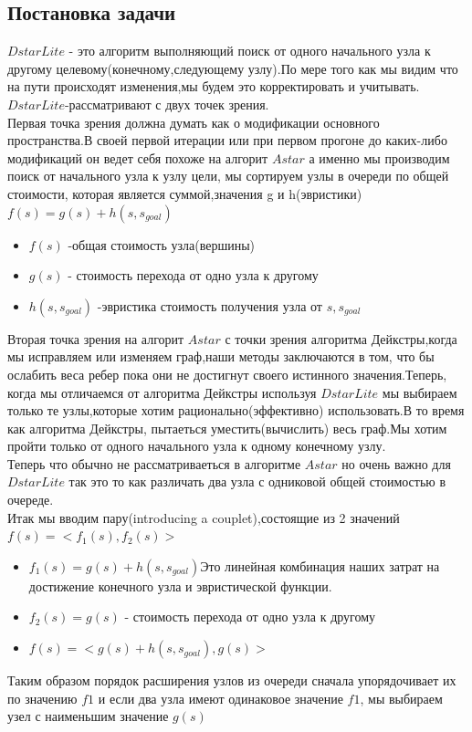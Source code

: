 \documentclass[12pt]{article}
\begin{document}
\subsection*{Постановка задачи}
$D star Lite$ - это алгоритм выполняющий поиск от одного начального узла к другому целевому(конечному,следующему узлу).По мере того как мы видим что на пути происходят изменения,мы будем это корректировать и учитывать.$D star Lite$-рассматривают с двух точек зрения.\\
Первая точка зрения должна думать как о модификации основного пространства.В своей первой итерации или при первом прогоне до каких-либо модификаций он ведет себя похоже на алгорит $A star$ а именно мы производим поиск от начального узла к узлу цели, мы сортируем узлы в очереди по общей стоимости, которая является суммой,значения g и h(эвристики)$f(s)=g(s)+h(s,s_{goal})$
\begin{itemize}
    \item $f(s)$ -общая стоимость узла(вершины)
    \item $g(s)$ - стоимость перехода от одно узла к другому
    \item $h(s,s_{goal})$ -эвристика стоимость получения узла от $s,s_{goal}$
\end{itemize}
Вторая точка зрения на алгорит $A star$ с точки зрения алгоритма Дейкстры,когда мы исправляем или изменяем граф,наши методы заключаются в том, что бы ослабить веса ребер пока они не достигнут своего истинного значения.Теперь, когда мы отличаемся от алгоритма Дейкстры используя $D star Lite$ мы выбираем только те узлы,которые хотим рационально(эффективно) использовать.В то время как алгоритма Дейкстры, пытаеться уместить(вычислить) весь граф.Мы хотим пройти только от одного начального узла к одному конечному узлу.\\
Теперь что обычно не рассматриваеться в алгоритме $A star$ но очень важно для $D star Lite$ так это то как различать два узла с одниковой общей стоимостью в очереде.\\
Итак мы вводим пару(introducing a couplet),состоящие из 2 значений $f(s)=<f_1(s),f_2(s)>$
\begin{itemize}
    \item $f_1(s)=g(s)+h(s,s_{goal})$Это линейная комбинация наших затрат на достижение конечного узла и эвристической функции.
    \item $f_2(s)=g(s)$ - стоимость перехода от одно узла к другому
    \item $f(s)=<g(s)+h(s,s_{goal}),g(s)>$
\end{itemize}
Таким образом порядок расширения узлов из очереди сначала упорядочивает их по значению $f1$  и если два узла имеют одинаковое значение $f1$, мы выбираем узел с наименьшим значение $g(s)$
\end{document}
